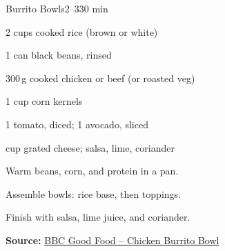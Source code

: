 \begin{recipebox}{Burrito Bowls}{2--3}{30 min}
\begin{ingredients}
  \item 2 cups cooked rice (brown or white)
  \item 1 can black beans, rinsed
  \item 300\,g cooked chicken or beef (or roasted veg)
  \item 1 cup corn kernels
  \item 1 tomato, diced; 1 avocado, sliced
  \item {} cup grated cheese; salsa, lime, coriander
\end{ingredients}
\begin{method}
  \item Warm beans, corn, and protein in a pan.
  \item Assemble bowls: rice base, then toppings.
  \item Finish with salsa, lime juice, and coriander.
\end{method}
\textbf{Source:} \href{https://www.bbcgoodfood.com/recipes/chicken-burrito-bowl}{BBC Good Food – Chicken Burrito Bowl}
\end{recipebox}
